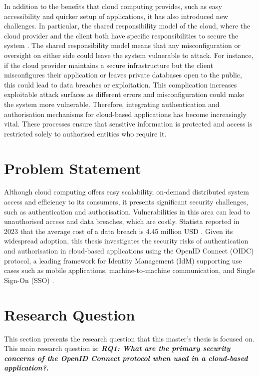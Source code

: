 In addition to the benefits that cloud computing provides, such as easy accessibility and quicker setup of applications, it has also introduced new challenges. In particular, the shared responsibility model of the cloud, where the cloud provider and the client both have specific responsibilities to secure the system \citep{shared_principal}. The shared responsibility model means that any misconfiguration or oversight on either side could leave the system vulnerable to attack. For instance, if the cloud provider maintains a secure infrastructure but the client misconfigures their application or leaves private databases open to the public, this could lead to data breaches or exploitation. This complication increases exploitable attack surfaces as different errors and misconfiguration could make the system more vulnerable. Therefore, integrating authentication and authorisation mechanisms for cloud-based applications has become increasingly vital. These processes ensure that sensitive information is protected and access is restricted solely to authorised entities who require it. \newpage


\section{Problem Statement}
Although cloud computing offers easy scalability, on-demand distributed system access and efficiency to its consumers, it presents significant security challenges, such as authentication and authorisation. Vulnerabilities in this area can lead to unauthorised access and data breaches, which are costly. Statista reported in 2023 that the average cost of a data breach is 4.45 million USD  \citep{statista_data_breach}. Given its widespread adoption, this thesis investigates the security risks of authentication and authorisation in cloud-based applications using the OpenID Connect (OIDC) protocol, a leading framework for Identity Management (IdM) supporting use cases such as mobile applications, machine-to-machine communication, and Single Sign-On (SSO)  \citep{oidc_popular}.


\section{Research Question}\label{sec:objectives}
This section presents the research question that this master's thesis is focused on. This main research question is:
\textbf{\textit{RQ1: What are the primary security concerns of the OpenID Connect protocol when used in a cloud-based application?}.}


